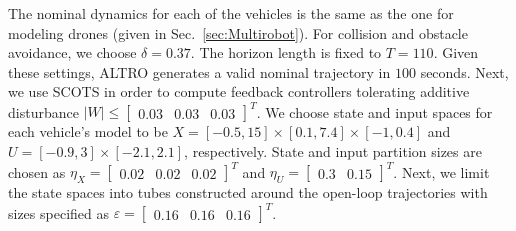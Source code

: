 The nominal dynamics for each of the vehicles is the same as the one  for modeling drones (given in Sec.~\ref{sec:Multirobot}). %
For collision and obstacle avoidance, we choose $\delta=0.37$. %
The horizon length is fixed to $T=110$. 
Given these settings, ALTRO generates a valid nominal trajectory in $100$ seconds. 
Next, we use SCOTS in order to compute feedback controllers tolerating additive disturbance $|W|\leq\begin{bmatrix}0.03&0.03&0.03\end{bmatrix}^T$. We choose state and input spaces for each vehicle's model to be $X=[-0.5,15]\times[0.1,7.4]\times[-1,0.4]$ and $U=[-0.9,3]\times[-2.1,2.1]$, respectively. State and input partition sizes are chosen as $\eta_{X}=\begin{bmatrix}0.02&0.02&0.02\end{bmatrix}^T$ and $\eta_{U}=\begin{bmatrix}0.3&0.15\end{bmatrix}^T$. %
Next, we limit the state spaces into tubes constructed around the open-loop trajectories with sizes specified as $\varepsilon=\begin{bmatrix}0.16&0.16&0.16\end{bmatrix}^T$. 
